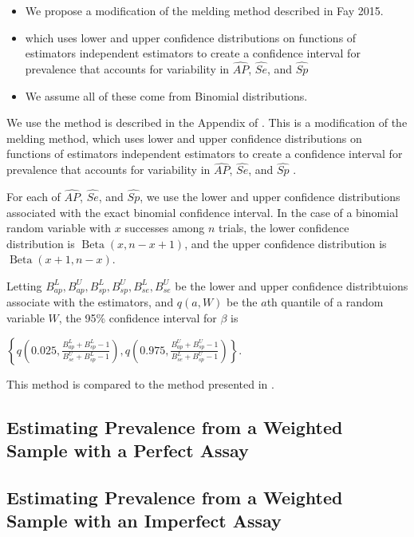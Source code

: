 \documentclass[AMA,STIX1COL]{WileyNJD-v2}
\begin{document}
\begin{itemize}
    \item We propose a modification of the melding method described in Fay 2015.
    \item which uses lower and upper confidence distributions on functions of estimators independent estimators to create a confidence interval for prevalence that accounts for variability in \( \widehat{AP} \), \( \widehat{Se} \), and \( \widehat{Sp} \)
    \item We assume all of these come from Binomial distributions.
\end{itemize}

We use the method is described in the Appendix of \cite{Kali:2021}.
This is a modification of the melding method, which uses lower and upper confidence distributions on functions of estimators independent estimators to create a confidence interval for prevalence that accounts for variability in \( \widehat{AP} \), \( \widehat{Se} \), and \( \widehat{Sp} \) \cite{FayP:2015}.

For each of \( \widehat{AP} \), \( \widehat{Se} \), and \( \widehat{Sp} \), we use the lower and upper confidence distributions associated with the exact binomial confidence interval.
In the case of a binomial random variable with \( x \) successes among \( n \) trials, the lower confidence distribution is \( \operatorname{Beta}(x, n - x + 1) \), and the upper confidence distribution is \( \operatorname{Beta}(x + 1, n - x) \).

Letting \( B_{ap}^L, B_{ap}^U, B_{sp}^L, B_{sp}^U, B_{se}^L, B_{se}^U \) be the lower and upper confidence distribtuions associate with the estimators, and \( q(a, W) \) be the \( a \)th quantile of a random variable \( W \), the 95\% confidence interval for \( \beta \) is 


\( \left\{ q \left( 0.025, \frac{B_{ap}^L + B_{sp}^L - 1}{B_{se}^U + B_{sp}^L - 1}  \right),  q \left( 0.975, \frac{B_{ap}^U + B_{sp}^U - 1}{B_{se}^L + B_{sp}^U - 1}  \right) \right\}.\)

This method is compared to the method presented in \citet{Lang:2014}.

\subsection{Estimating Prevalence from a Weighted Sample with a Perfect Assay}



\subsection{Estimating Prevalence from a Weighted Sample with an  Imperfect Assay}
\end{document}
